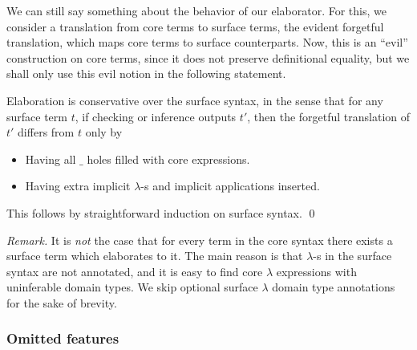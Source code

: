 \documentclass[acmsmall,review,anonymous,prologue,dvipsnames]{acmart}\settopmatter{printfolios=true,printccs=false,printacmref=false}
\theoremstyle{remark}
\begin{document}
We can still say something about the behavior of our elaborator. For this, we
consider a translation from core terms to surface terms, the evident forgetful
translation, which maps core terms to surface counterparts. Now, this is an
``evil'' construction on core terms, since it does not preserve definitional
equality, but we shall only use this evil notion in the following statement.

\begin{theorem}[Conservativity]\label{thm:conservativity}
Elaboration is conservative over the surface syntax, in the sense that for any
surface term $t$, if checking or inference outputs $t'$, then the forgetful
translation of $t'$ differs from $t$ only by
  \begin{itemize}
    \item Having all $\_$ holes filled with core expressions.
    \item Having extra implicit $\lambda$-s and implicit applications inserted.
  \end{itemize}
This follows by straightforward induction on surface syntax. \qed
\end{theorem}

\emph{Remark.} It is \emph{not} the case that for every term in the core syntax
there exists a surface term which elaborates to it. The main reason is that
$\lambda$-s in the surface syntax are not annotated, and it is easy to find core
$\lambda$ expressions with uninferable domain types. We skip optional surface
$\lambda$ domain type annotations for the sake of brevity.

\subsubsection{Omitted features}
\end{document}
